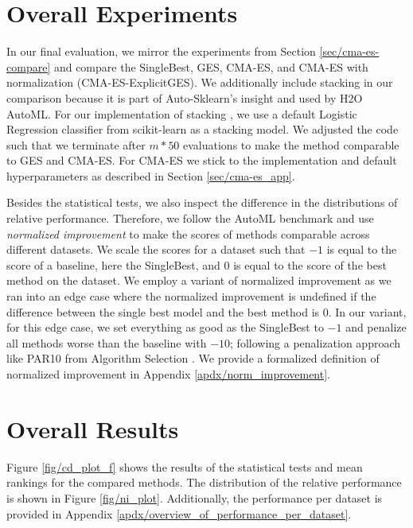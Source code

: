 \documentclass[11pt]{article}
\newcommand{\nbc}[3]{
		{\colorbox{#3}{\bfseries\sffamily\scriptsize\textcolor{white}{#1}}}
		{\textcolor{#3}{\sf\small$\blacktriangleright$\textit{#2}$\blacktriangleleft$}}
}
\newcommand{\changed}[1]{\nbc{CHANGED}{#1}{changedcolor}}
\renewcommand{\changed}[1]{{\color{changedcolor}#1}}
\renewcommand{\changed}[1]{{#1}}
\begin{document}
\section{Overall Experiments}
\label{sec/exp}
In our final evaluation, we mirror the experiments from Section \ref{sec/cma-es-compare} and compare the SingleBest, GES, CMA-ES, and CMA-ES with normalization (CMA-ES-ExplicitGES). 
\changed{We additionally include stacking in our comparison because it is part of Auto-Sklearn’s insight and used by H2O AutoML.}
For our implementation of stacking \citep{stakcingWolpert}, we use a default Logistic Regression classifier from scikit-learn \citep{scikit-learn} as a stacking model.
We adjusted the code such that we terminate after $m*50$ evaluations to make the method comparable to GES and CMA-ES.
For CMA-ES we stick to the implementation and default hyperparameters as described in Section \ref{sec/cma-es_app}.

Besides the statistical tests, we also inspect the difference in the distributions of relative performance.
Therefore, we follow the AutoML benchmark \citep{automl_benchmark_2022} and use \emph{normalized improvement} to make the scores of methods comparable across different datasets. 
We scale the scores for a dataset such that $-1$ is equal to the score of a baseline, here the SingleBest, and $0$ is equal to the score of the best method on the dataset.
We employ a variant of normalized improvement as we ran into an edge case where the normalized improvement is undefined if the difference between the single best model and the best method is $0$. 
In our variant, for this edge case, we set everything as good as the SingleBest to $-1$ and penalize all methods worse than the baseline with $-10$\changed{; following a penalization approach like PAR10 from Algorithm Selection \citep{DBLP:journals/ai/LindauerRK19}. 
We provide a formalized definition of normalized improvement in Appendix \ref{apdx/norm_improvement}. 
}

\section{Overall Results}
\label{sec/results}

Figure \ref{fig/cd_plot_f} shows the results of the statistical tests and mean rankings for the compared methods. 
The distribution of the relative performance is shown in Figure \ref{fig/ni_plot}. \changed{Additionally, the performance per dataset is provided in Appendix \ref{apdx/overview_of_performance_per_dataset}.}
\end{document}
